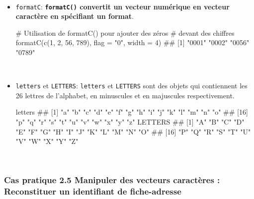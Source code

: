 \documentclass[12pt,twosided, notitlepage]{book}
\newenvironment{Shaded}{}{}
\newcommand{\KeywordTok}[1]{\textcolor[rgb]{0.00,0.00,1.00}{#1}}
\newcommand{\DataTypeTok}[1]{#1}
\newcommand{\DecValTok}[1]{#1}
\newcommand{\StringTok}[1]{\textcolor[rgb]{0.00,0.50,0.50}{#1}}
\newcommand{\CommentTok}[1]{\textcolor[rgb]{0.00,0.50,0.00}{#1}}
\newcommand{\NormalTok}[1]{#1}
\renewenvironment{Shaded}{\begin{snugshade}}{\end{snugshade}}
\begin{document}
~

\begin{itemize}
\item
  \texttt{formatC}:
  \textbf{\texttt{formatC()} convertit un vecteur numérique en vecteur
  caractère en spécifiant un format}.

\begin{Shaded}
\begin{Highlighting}[]
\CommentTok{# Utilisation de formatC() pour ajouter des zéros}
\CommentTok{# devant des chiffres }
\KeywordTok{formatC}\NormalTok{(}\KeywordTok{c}\NormalTok{(}\DecValTok{1}\NormalTok{, }\DecValTok{2}\NormalTok{, }\DecValTok{56}\NormalTok{, }\DecValTok{789}\NormalTok{), }\DataTypeTok{flag =} \StringTok{"0"}\NormalTok{, }\DataTypeTok{width =} \DecValTok{4}\NormalTok{)}
\NormalTok{  ## [1] "0001" "0002" "0056" "0789"}
\end{Highlighting}
\end{Shaded}
\end{itemize}

~

\begin{itemize}
\item
  \texttt{letters} et \texttt{LETTERS}: \texttt{letters} et
  \texttt{LETTERS} sont des objets qui contiennent les 26 lettres de
  l'alphabet, en minuscules et en majuscules respectivement.

\begin{Shaded}
\begin{Highlighting}[]
\NormalTok{letters}
\NormalTok{  ##  [1] "a" "b" "c" "d" "e" "f" "g" "h" "i" "j" "k" "l" "m" "n" "o"}
\NormalTok{  ## [16] "p" "q" "r" "s" "t" "u" "v" "w" "x" "y" "z"}
\NormalTok{LETTERS}
\NormalTok{  ##  [1] "A" "B" "C" "D" "E" "F" "G" "H" "I" "J" "K" "L" "M" "N" "O"}
\NormalTok{  ## [16] "P" "Q" "R" "S" "T" "U" "V" "W" "X" "Y" "Z"}
\end{Highlighting}
\end{Shaded}
\end{itemize}

~

\subsubsection{\texorpdfstring{\textbf{Cas pratique 2.5} Manipuler des
vecteurs caractères : Reconstituer un identifiant de
fiche-adresse}{Cas pratique 2.5 Manipuler des vecteurs caractères : Reconstituer un identifiant de fiche-adresse}}\label{cas-pratique-2.5-manipuler-des-vecteurs-caracteres-reconstituer-un-identifiant-de-fiche-adresse}
\end{document}
